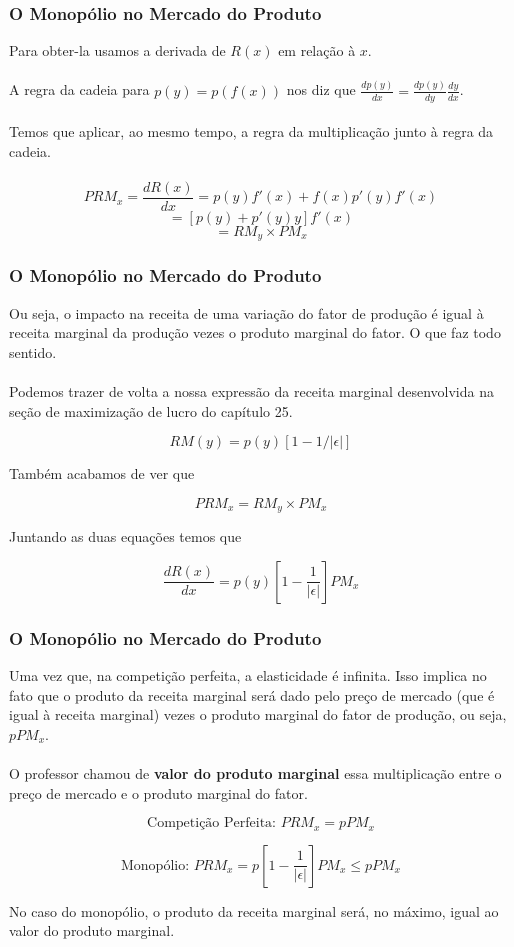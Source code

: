 \documentclass{beamer}[10]
\begin{document}
\begin{frame}
	\frametitle{O Monopólio no Mercado do Produto}

	Para obter-la usamos a derivada de $R(x)$ em relação à $x$.
	\\~\\
	A regra da cadeia para $p(y) = p(f(x))$ nos diz que $\frac{d p(y) }{d x} = \frac{d p(y)}{d y} \frac{d y}{d x} $.
	\\~\\
	Temos que aplicar, ao mesmo tempo, a regra da multiplicação junto à regra da cadeia.
	\\~\\
	$$ PRM_x = \frac{d R(x)}{d x} = p(y)f'(x) + f(x)p'(y)f'(x) $$
	$$ = [p(y) + p'(y)y]f'(x) $$
	$$ = RM_y \times PM_x $$

\end{frame}

\begin{frame}
	\frametitle{O Monopólio no Mercado do Produto}

	Ou seja, o impacto na receita de uma variação do fator de produção é igual à receita marginal da produção vezes o produto marginal do fator. O que faz todo sentido.
	\\~\\
	Podemos trazer de volta a nossa expressão da receita marginal desenvolvida na seção de maximização de lucro do capítulo 25. 
	
	$$RM(y) = p(y) \left[ 1 - 1/|\epsilon| \right]$$

	Também acabamos de ver que

	$$PRM_x = RM_y \times PM_x $$

	Juntando as duas equações temos que

	$$ \frac{d R(x)}{d x} = p(y) \left[ 1 - \frac{1}{|\epsilon|} \right] PM_x $$

\end{frame}

\begin{frame}
	\frametitle{O Monopólio no Mercado do Produto}

	Uma vez que, na competição perfeita, a elasticidade é infinita. Isso implica no fato que o produto da receita marginal será dado pelo preço de mercado (que é igual à receita marginal) vezes o produto marginal do fator de produção, ou seja, $p PM_x$. 
	\\~\\
	O professor chamou de \textbf{valor do produto marginal} essa multiplicação entre o preço de mercado e o produto marginal do fator.

	$$ \textrm{Competição Perfeita: } PRM_x = p PM_x $$

	$$ \textrm{Monopólio: } PRM_x = p \left[ 1 - \frac{1}{|\epsilon|} \right] PM_x \leq pPM_x $$

	No caso do monopólio, o produto da receita marginal será, no máximo, igual ao valor do produto marginal.

\end{frame}
\end{document}
